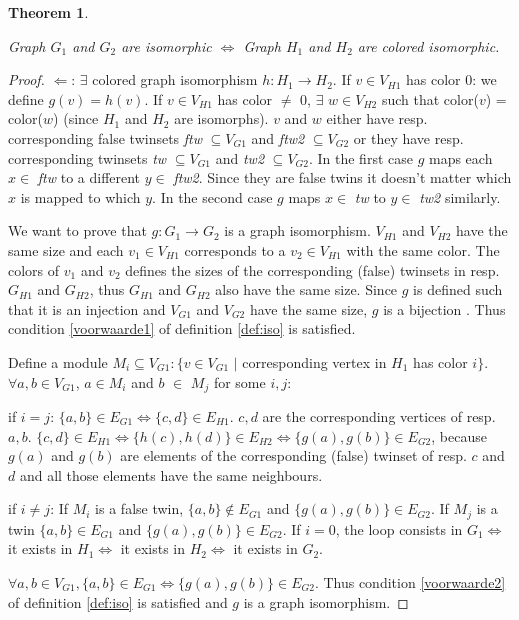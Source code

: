 \documentclass[twoside]{article}
\theoremstyle{definition}
\theoremstyle{plain}
\newtheorem{theorem}{Theorem}
\begin{document}
\begin{multicols}{2}
\begin{theorem}
\begin{compactenum}[\upshape(a)]
\end{compactenum}
Graph $G_1$ and $G_2$ are isomorphic $\iff$ Graph $H_1$ and $H_2$ are colored isomorphic.
\end{theorem}
\begin{proof}


$\Leftarrow$:  $\exists$ colored graph isomorphism $h: H_1 \to H_2$. If $v \in V_{H1}$ has color 0: we define $g(v) = h(v)$.
If $v \in V_{H1}$ has color $\neq$ 0, $\exists$ $ w \in V_{H2}$ such that color($v$) = color($w$) (since $H_1$ and $H_2$ are isomorphs). $v$ and $w$ either have resp. corresponding false twinsets \emph{ftw} $\subseteq V_{G1}$ and \emph{ftw2} $\subseteq V_{G2}$ or they have resp. corresponding twinsets \emph{tw} $\subseteq V_{G1}$ and \emph{tw2} $\subseteq V_{G2}$. In the first case $g$ maps each $x \in$ \emph{ftw} to a different $y \in$ \emph{ftw2}. Since they are false twins it doesn't matter which $x$ is mapped to which $y$. In the second case $g$ maps $x \in$ \emph{tw} to $y \in$ \emph{tw2} similarly. 

We want to prove that $g: G_1 \to G_2$ is a graph isomorphism. $V_{H1}$ and $V_{H2}$ have the same size and each $v_1 \in V_{H1}$ corresponds to a $v_2 \in V_{H1}$ with the same color. The colors of $v_1$ and $v_2$ defines the sizes of the corresponding (false) twinsets in resp. $G_{H1}$ and $G_{H2}$, thus $G_{H1}$ and $G_{H2}$ also have the same size. Since $g$ is defined such that it is an injection and $V_{G1}$ and $V_{G2}$ have the same size, $g$ is a bijection \cite{website:proofwiki}. Thus condition \ref{voorwaarde1} of definition \ref{def:iso} is satisfied. 

Define a module $M_i \subseteq V_{G1}: \{v \in V_{G1}$ $|$ corresponding vertex in $H_1$ has color $i \}$. $\forall a, b \in V_{G1}$, $a \in M_i$ and $b$ $\in$ $M_j$ for some $i,j$: 
\begin{compactenum}
\item if $i = j$: $\{a,b\} \in E_{G1} \iff \{c,d\} \in E_{H1}$. $c,d$ are the corresponding vertices of resp. $a,b$. $\{c,d\} \in E_{H1} \iff \{h(c),h(d)\} \in E_{H2} \iff \{g(a),g(b)\} \in E_{G2}$, because $g(a)$ and $g(b)$ are elements of the corresponding (false) twinset of resp. $c$ and $d$ and all those elements have the same neighbours. 
\item if $i \neq j$: If $M_i$ is a false twin, $\{a,b\} \notin E_{G1} $ and $\{g(a),g(b)\} \in E_{G2}$. If $M_j$ is a twin $\{a,b\} \in E_{G1} $ and $\{g(a),g(b)\}\in E_{G2}$. If $i = 0$, the loop consists in $G_1 \iff$ it exists in $H_1 \iff$ it exists in $H_2 \iff$ it exists in $G_2$.
\end{compactenum} 
$\forall a, b \in V_{G1}, \{a, b\} \in E_{G1} \iff \{g(a), g(b)\} \in E_{G2}$.
Thus condition \ref{voorwaarde2} of definition \ref{def:iso} is satisfied and $g$ is a graph isomorphism. 



\end{proof}
\end{multicols}
\end{document}
